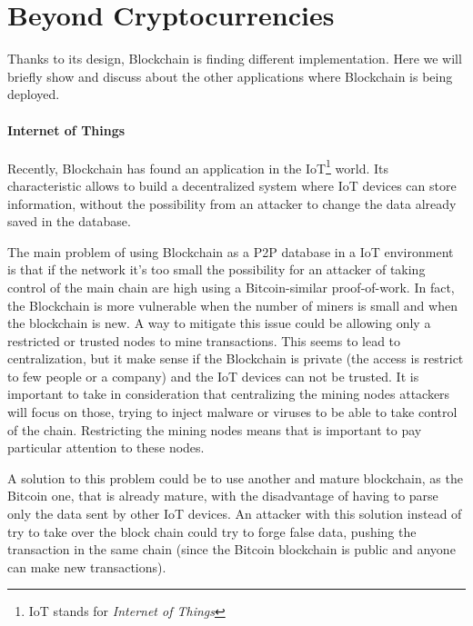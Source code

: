 \section{Beyond Cryptocurrencies}
\label{sec:beyond_crypto}

Thanks to its design, Blockchain is finding different implementation. Here
we will briefly show and discuss about the other applications where Blockchain
is being deployed.

\paragraph*{Internet of Things}

Recently, Blockchain has found an application in the IoT\footnote{IoT stands
for \textit{Internet of Things}} world\cite{politecnico16}. Its characteristic
allows to build a decentralized system where IoT devices can store information,
without the possibility from an attacker to change the data already saved in
the database\cite{politecnico16}.

The main problem of using Blockchain as a P2P database in a IoT environment is
that if the network it's too small the possibility for an attacker of taking
control of the main chain are high using a Bitcoin-similar proof-of-work. In
fact, the Blockchain is more vulnerable when the number of miners is small and
when the blockchain is new. A way to mitigate this issue could be allowing only
a restricted or trusted nodes to mine transactions. This seems to lead to
centralization, but it make sense if the Blockchain is private (the access is
restrict to few people or a company) and the IoT devices can not be trusted.
It is important to take in consideration that centralizing the mining nodes
attackers will focus on those, trying to inject malware or viruses to be able to
take control of the chain. Restricting the mining nodes means that is important
to pay particular attention to these nodes.

A solution to this problem could be to use another and mature blockchain, as the
Bitcoin one, that is already mature, with the disadvantage of having to parse
only the data sent by other IoT devices. An attacker with this solution instead
of try to take over the block chain could try to forge false data, pushing the
transaction in the same chain (since the Bitcoin blockchain is public and
anyone can make new transactions).


